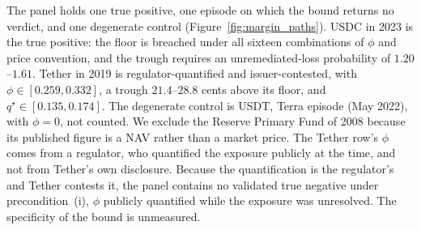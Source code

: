 The panel holds one true positive, one episode on which the bound returns no verdict, and
one degenerate control (Figure~\ref{fig:margin_paths}). USDC in 2023 is the true
positive: the floor is breached under all sixteen combinations of $\phi$ and price convention, and the trough requires an unremediated-loss probability of
$1.20$--$1.61$. Tether in 2019 is regulator-quantified and
issuer-contested, with $\phi\in[0.259,0.332]$, a trough $21.4$--$28.8$ cents above its
floor, and $q^{\star}\in[0.135,0.174]$. The degenerate control is USDT, Terra episode (May
2022), with $\phi=0$, not counted. We exclude the Reserve Primary Fund of 2008 because its
published figure is a NAV rather than a market price. The Tether row's $\phi$ comes from a
regulator, who quantified the exposure publicly at the time, and not from Tether's own
disclosure. Because the quantification is the regulator's and Tether contests it, the
panel contains no validated true negative under precondition~(i), $\phi$ publicly
quantified while the exposure was unresolved. The specificity of the bound is unmeasured.
